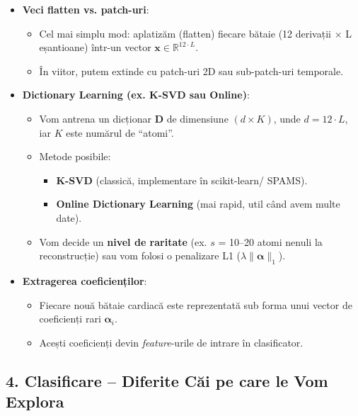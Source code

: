 \documentclass[12pt]{article}
\begin{document}
\begin{itemize}
    \item \textbf{Veci flatten vs. patch-uri}:
    \begin{itemize}
        \item Cel mai simplu mod: aplatizăm (flatten) fiecare bătaie (12 derivații $\times$ L eșantioane) într-un vector $\mathbf{x} \in \mathbb{R}^{12 \cdot L}$.
        \item În viitor, putem extinde cu patch-uri 2D sau sub-patch-uri temporale.
    \end{itemize}

    \item \textbf{Dictionary Learning (ex. K-SVD sau Online)}:
    \begin{itemize}
        \item Vom antrena un dicționar $\mathbf{D}$ de dimensiune $(d \times K)$, unde $d = 12 \cdot L$, iar $K$ este numărul de “atomi”.
        \item Metode posibile:
        \begin{itemize}
            \item \textbf{K-SVD} (classică, implementare în scikit-learn/ SPAMS).
            \item \textbf{Online Dictionary Learning} (mai rapid, util când avem multe date).
        \end{itemize}
        \item Vom decide un \textbf{nivel de raritate} (ex. $s$ = 10--20 atomi nenuli la reconstrucție) sau vom folosi o penalizare L1 ($\lambda \|\boldsymbol{\alpha}\|_1$).
    \end{itemize}

    \item \textbf{Extragerea coeficienților}:
    \begin{itemize}
        \item Fiecare nouă bătaie cardiacă este reprezentată sub forma unui vector de coeficienți rari $\boldsymbol{\alpha}_i$.
        \item Acești coeficienți devin \emph{feature}-urile de intrare în clasificator.
    \end{itemize}
\end{itemize}

\subsection*{4. Clasificare -- Diferite Căi pe care le Vom Explora}
\end{document}
